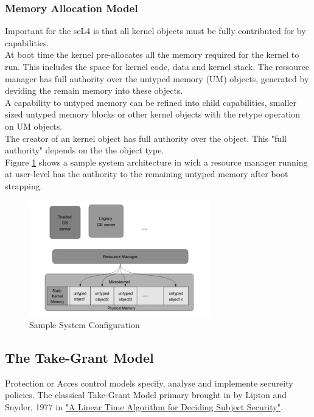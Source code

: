 \documentclass[pdftex,11pt,a4paper]{article}
\begin{document}
	\subsubsection{Memory Allocation Model}
	Important for the seL4 is that all kernel objects must be fully contributed for by capabilities. \\
	At boot time the kernel pre-allocates all the memory required for the kernel to run. This includes the space for kernel code, data and kernel stack. The ressource manager has full authority over the untyped memory (UM) objects, generated by deviding the remain memory into these objects. \\
	A capability to untyped memory can be refined into child capabilities, smaller sized untyped memory blocks or other kernel objects with the retype operation on UM objects. \\
	The creator of an kernel object has full authority over the object. This "full authority" depends on the the object type. \\
	Figure \ref{fig:systarch} shows a sample system architecture in wich a resource manager running at user-level  has the authority to the remaining untyped memory after boot strapping. 
	
	\begin{figure}[ht]
	\centering
		\includegraphics[width=0.7\textwidth]{./Pictures/MemoryAllocation.png}
	\caption[Sample system architecture]{Sample System Configuration \cite{TakeG}}
	\label{fig:systarch}
	\end{figure}	
	
	\newpage
	\subsection{The Take-Grant Model}	
	Protection or Acces control models specify, analyse and implemente secureity policies. 
	The classical Take-Grant Model primary brought in by Lipton and Snyder, 1977 in  \href{https://www.cs.nmt.edu/~doshin/t/s06/cs589/pub/2.JLS-TG.pdf}{%
		"A Linear Time Algorithm for Deciding Subject Security"}.
\end{document}
